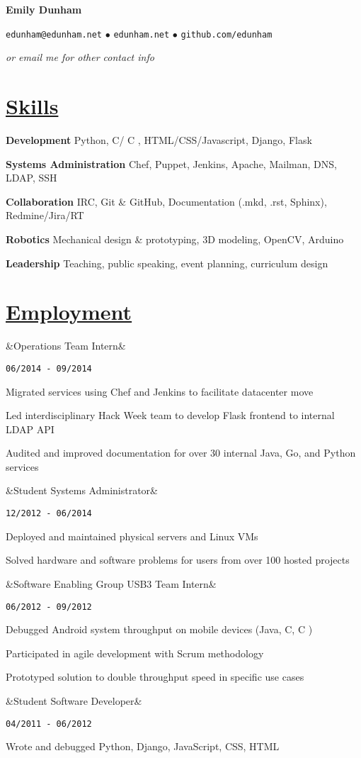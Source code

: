 \documentclass[11pt]{article}
\newcommand{\heading}[1]{
    \section*{\uline{\hfill #1}}
}
\newcommand{\squish}{
    \setlength{\itemsep}{0.5pt}
    \setlength{\parskip}{0pt}
    \setlength{\parsep}{0.5pt}
}
\newcommand{\when}[1]{
    \hfill \texttt{#1}
}
\newcommand{\experience}[3]{
    \ifx&#2&
        \item[{#1}]
    \else
        \item[{#1}, \emph{#2}]
    \fi
    \when{#3}
}
\newcommand{\contact}[3]{
    \centerline{
        \large       
        \texttt{#1}
        $\bullet$
        \texttt{#2}
        $\bullet$
        \texttt{#3}
    }
    \centerline{
        \emph{or email me for other contact info}
    }
}
\newcommand{\skill}[2]{
    \textbf{#1} \hfill #2

}
\newcommand{\CPP}{
    C\hspace{-.05em}\raisebox{.4ex}{\tiny\bf +}\hspace{-.10em}\raisebox{.4ex}{\tiny\bf +}
}
\begin{document}
\centerline{{\Huge \bf Emily Dunham}}
\bigskip

\contact{edunham@edunham.net}
        {edunham.net}
        {github.com/edunham}

\heading{Skills}%

\skill{Development}{Python, C/\CPP, HTML/CSS/Javascript, Django, Flask}

\skill{Systems Administration}{Chef, Puppet, Jenkins, Apache, Mailman, DNS, LDAP,
SSH}

\skill{Collaboration}{IRC, Git \& GitHub, Documentation (.mkd, .rst, Sphinx),
Redmine/Jira/RT} 

\skill{Robotics}{Mechanical design \& prototyping, 3D modeling, OpenCV, Arduino}

\skill{Leadership}{Teaching, public speaking, event planning, curriculum
design}

\heading{Employment}%

\begin{description}
\squish   
\experience{Urban Airship}
           {Operations Team Intern}
           {06/2014 - 09/2014}
    
    Migrated services using Chef and Jenkins to facilitate datacenter move

    Led interdisciplinary Hack Week team to develop Flask frontend to internal LDAP API

    Audited and improved documentation for over 30 internal Java, Go, and Python
    services

\experience{OSU Open Source Lab}
           {Student Systems Administrator}
           {12/2012 - 06/2014}

    Deployed and maintained physical servers and Linux VMs

    Solved hardware and software problems for users from over 100 hosted projects

\experience{Intel}
           {Software Enabling Group USB3 Team Intern}
           {06/2012 - 09/2012}

    Debugged Android system throughput on mobile devices (Java, C, \CPP)

    Participated in agile development with Scrum methodology

    Prototyped solution to double throughput speed in specific use cases

\experience{OSU Open Source Lab}
           {Student Software Developer}
           {04/2011 - 06/2012}

    Wrote and debugged Python, Django, JavaScript, CSS, HTML

\end{description}
\end{document}
